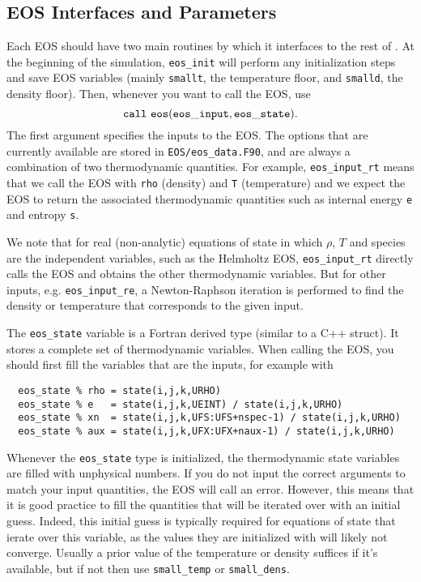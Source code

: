 \subsection{EOS Interfaces and Parameters}

Each EOS should have two main routines by which it interfaces to the
rest of \castro.  At the beginning of the simulation, {\tt eos\_init}
will perform any initialization steps and save EOS variables (mainly
\texttt{smallt}, the temperature floor, and \texttt{smalld}, the
density floor). Then, whenever you want to call the EOS, use
\[
  {\tt call\ eos (eos\_input, eos\_state)}.
\]
The first argument specifies the inputs to the EOS. The options 
that are currently available are stored in
{\tt EOS/eos\_data.F90}, and are always a combination of two
thermodynamic quantities. For example, {\tt eos\_input\_rt} means 
that we call the EOS with {\tt rho} (density) and {\tt T} (temperature) 
and we expect the EOS to return the associated thermodynamic 
quantities such as internal energy {\tt e} and entropy {\tt s}.

We note that for real (non-analytic) equations of state
in which $\rho$, $T$ and species are the independent variables, such
as the Helmholtz EOS, {\tt eos\_input\_rt} directly calls the EOS
and obtains the other thermodynamic variables. But for other inputs,
e.g. {\tt eos\_input\_re}, a Newton-Raphson iteration is performed
to find the density or temperature that corresponds to the given
input.

The {\tt eos\_state} variable is a Fortran derived type (similar to
a C++ struct). It stores a complete set of thermodynamic
variables. When calling the EOS, you should first fill the variables
that are the inputs, for example with
\begin{verbatim}
  eos_state % rho = state(i,j,k,URHO)
  eos_state % e   = state(i,j,k,UEINT) / state(i,j,k,URHO)
  eos_state % xn  = state(i,j,k,UFS:UFS+nspec-1) / state(i,j,k,URHO)
  eos_state % aux = state(i,j,k,UFX:UFX+naux-1) / state(i,j,k,URHO)
\end{verbatim}
Whenever the \texttt{eos\_state} type is initialized, the
thermodynamic state variables are filled with unphysical numbers. If
you do not input the correct arguments to match your input quantities,
the EOS will call an error. However, this means that it is good
practice to fill the quantities that will be iterated over with an
initial guess. Indeed, this initial guess is typically required for 
equations of state that ierate over this variable, as the values 
they are initialized with will likely not
converge. Usually a prior value of the temperature or density suffices
if it's available, but if not then use \texttt{small\_temp} or
\texttt{small\_dens}.

